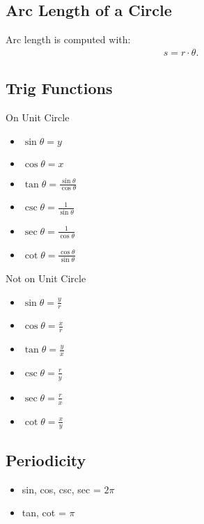 \documentclass{report}
\begin{document}
        \subsection{Arc Length of a Circle}
        \bigbreak \noindent 
        Arc length is computed with:
          \begin{align*}
            s = r \cdot \theta
          .\end{align*}

        \bigbreak \noindent \bigbreak \noindent 
        \subsection{Trig Functions}
        On Unit Circle
        \begin{itemize}
          \item $\sin{\theta} = y $
          \item $\cos{\theta} = x $
          \item $\tan{\theta } = \frac{\sin{\theta }}{\cos{\theta }} $
          \item $\csc{\theta }=  \frac{1}{\sin{\theta }} $
          \item $\sec{\theta }=  \frac{1}{\cos{\theta }} $
          \item $\cot{\theta }  = \frac{\cos{\theta }}{\sin{\theta }}$
        \end{itemize}
        \bigbreak \noindent 
        Not on Unit Circle
          \begin{itemize}
            \item $\sin{\theta } = \frac{y}{r} $
            \item $\cos{\theta } = \frac{x}{r} $
            \item $\tan{\theta }  = \frac{y}{x} $
            \item $\csc{\theta }  = \frac{r}{y} $
            \item $\sec{\theta }  = \frac{r}{x} $
            \item $\cot{\theta }  = \frac{x}{y} $
          \end{itemize}

        \bigbreak \noindent \bigbreak \noindent 
        \subsection{Periodicity}
        \begin{itemize}
          \item sin, cos, csc, sec = $2\pi$
          \item tan, cot = $\pi$
        \end{itemize}
\end{document}
